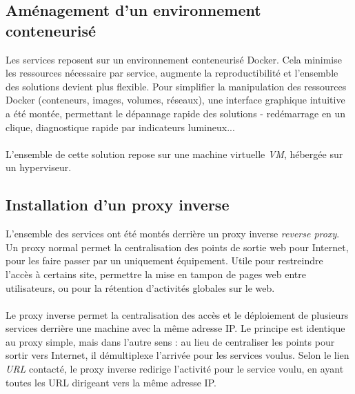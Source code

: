 \subsection{Aménagement d'un environnement conteneurisé}

Les services reposent sur un environnement conteneurisé Docker. Cela minimise les ressources nécessaire par service, augmente la reproductibilité et l'ensemble des solutions devient plus flexible. Pour simplifier la manipulation des ressources Docker (conteneurs, images, volumes, réseaux), une interface graphique intuitive a été montée, permettant le dépannage rapide des solutions - redémarrage en un clique, diagnostique rapide par indicateurs lumineux...
\\ \\
L'ensemble de cette solution repose sur une machine virtuelle \textit{VM}, hébergée sur un hyperviseur.

\subsection{Installation d'un proxy inverse}

L'ensemble des services ont été montés derrière un proxy inverse \textit{reverse proxy}. Un proxy normal permet la centralisation des points de sortie web pour Internet, pour les faire passer par un uniquement équipement. Utile pour restreindre l'accès à certains site, permettre la mise en tampon de pages web entre utilisateurs, ou pour la rétention d'activités globales sur le web.
\\ \\
Le proxy inverse permet la centralisation des accès et le déploiement de plusieurs services derrière une machine avec la même adresse IP. Le principe est identique au proxy simple, mais dans l'autre sens : au lieu de centraliser les points pour sortir vers Internet, il démultiplexe l'arrivée pour les services voulus. Selon le lien \textit{URL} contacté, le proxy inverse redirige l'activité pour le service voulu, en ayant toutes les URL dirigeant vers la même adresse IP.

